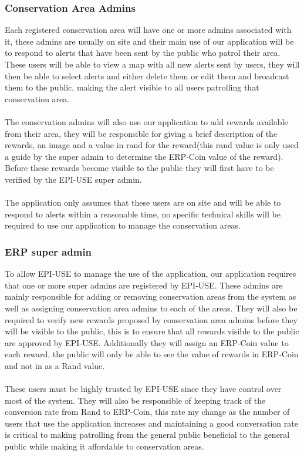 \documentclass{article}
\begin{document}
\subsubsection*{Conservation Area Admins}
Each registered conservation area will have one or more admins associated with it, these admins are usually on site and their main use of our application will be to respond to alerts that have been sent by the public who patrol their area. These users will be able to view a map with all new alerts sent by users, they will then be able to select alerts and either delete them or edit them and broadcast them to the public, making the alert visible to all users patrolling that conservation area.\\\\The conservation admins will also use our application to add rewards available from their area, they will be responsible for giving a brief description of the rewards, an image and a value in rand for the reward(this rand value is only used a guide by the super admin to determine the ERP-Coin value of the reward). Before these rewards become visible to the public they will first have to be verified by the EPI-USE super admin.\\\\The application only assumes that these users are on site and will be able to respond to alerts within a reasonable time, no specific technical skills will be required to use our application to manage the conservation areas.\\

\subsubsection*{ERP super admin}

To allow EPI-USE to manage the use of the application, our application requires that one or more super admins are registered by EPI-USE. These admins are mainly responsible for adding or removing conservation areas from the system as well as assigning conservation area admins to each of the areas. They will also be required to verify new rewards proposed by conservation area admins before they will be visible to the public, this is to ensure that all rewards visible to the public are approved by EPI-USE. Additionally they will assign an ERP-Coin value to each reward, the public will only be able to see the value of rewards in ERP-Coin and not in as a Rand value.\\\\These users must be highly trusted by EPI-USE since they have control over most of the system. They will also be responsible of keeping track of the conversion rate from Rand to ERP-Coin, this rate my change as the number of users that use the application increases and maintaining a good conversation rate is critical to making patrolling from the general public beneficial to the general public while making it affordable to conservation areas. 
\end{document}
